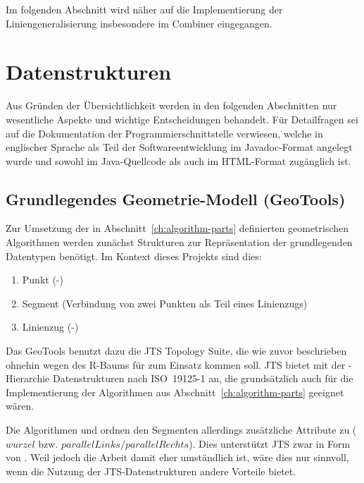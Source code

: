 \documentclass[../main/thesis.tex]{subfiles}
\begin{document}

Im folgenden Abschnitt wird näher auf die Implementierung der Liniengeneralisierung insbesondere im Combiner eingegangen.



\section{Datenstrukturen}
\label{ch:data-structures}


Aus Gründen der Übersichtlichkeit werden in den folgenden Abschnitten nur wesentliche Aspekte und wichtige Entscheidungen behandelt.
Für Detailfragen sei auf die Dokumentation der Programmierschnittstelle verwiesen, welche in englischer Sprache als Teil der Softwareentwicklung im Javadoc-Format angelegt wurde und sowohl im Java-Quellcode als auch im HTML-Format zugänglich ist.



\subsection{Grundlegendes Geometrie-Modell (GeoTools)}

Zur Umsetzung der in Abschnitt~\ref{ch:algorithm-parts} definierten geometrischen Algorithmen werden zunächst Strukturen zur Repräsentation der grundlegenden Datentypen benötigt.
Im Kontext dieses Projekts sind dies:
\begin{enumerate}[nosep]
	\item Punkt (\osm-)
	\item Segment (Verbindung von zwei Punkten als Teil eines Linienzugs)
	\item Linienzug (\osm-)
\end{enumerate}

\noindent
Das  GeoTools benutzt dazu die JTS Topology Suite, die wie zuvor beschrieben ohnehin wegen des R-Baums für  zum Einsatz kommen soll.
JTS bietet mit der -Hierarchie Datenstrukturen nach ISO~19125\hbox{-}1 an, die grundsätzlich auch für die Implementierung der Algorithmen aus Abschnitt~\ref{ch:algorithm-parts} geeignet wären.

Die Algorithmen  und  ordnen den Segmenten allerdings zusätzliche Attribute zu ($wurzel$ bzw. $parallelLinks / parallelRechts$).
Dies unterstützt JTS zwar in Form von .
Weil jedoch die Arbeit damit eher umständlich ist, wäre dies nur sinnvoll, wenn die Nutzung der JTS-Datenstrukturen andere Vorteile bietet.
\end{document}
